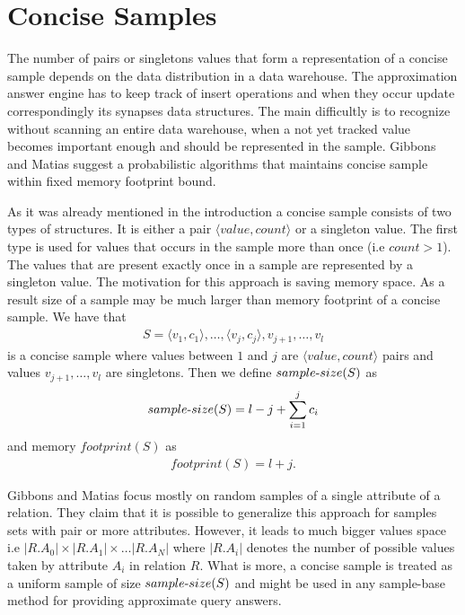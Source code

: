 \section{Concise Samples}
The number of pairs or singletons values that form a representation
of a concise sample depends on the data distribution in a data
warehouse. The approximation answer engine has to keep track of insert
operations and when they occur update correspondingly its synapses data structures.
The main difficultly is to recognize without scanning
an entire data warehouse, when a not yet tracked value becomes
important enough and should be represented in the sample. Gibbons and
Matias \cite{GM98} suggest a probabilistic
algorithms that maintains concise sample within fixed memory
footprint bound.

As it was already mentioned in the introduction a concise sample
consists of two types of structures. It is
either a pair $\langle value, count \rangle $ or a singleton value. The first
type is used for values that occurs in the sample more than once
(i.e $count > 1$). The values that are present exactly once in a sample
are represented by a singleton value. The motivation for this
approach is saving memory space. As a result size of a sample may be
much larger than memory footprint of a concise sample. We have that
\begin{align*}
  S = {\langle v_1, c_1 \rangle, \dots, \langle v_j, c_j \rangle,
    v_{j+1}, \dots, v_l }
\end{align*}
is a concise sample where values between $1$ and $j$ are $\langle
value, count \rangle$ pairs and values $v_{j+1}, \dots, v_l$ are
singletons. Then we define $sample \text{-} size(S)$ as
\begin{align*}
sample \text{-} size(S) = l - j + \sum_{i=1}^j c_i
\end{align*}
and memory $footprint(S)$ as
\begin{align*}
footprint(S) = l + j.
\end{align*}

Gibbons and Matias \cite{GM98} focus mostly on random
samples of a single attribute of a relation.
They claim that it is possible to generalize this
approach for samples sets with pair or more attributes. However, it
leads to much bigger values space i.e $ |R.A_0| \times |R.A_1| \times
\dots |R.A_N|$ where $|R.A_i|$ denotes the number of possible values taken by
attribute $A_i$ in relation $R$. What is more, a concise sample is
treated as a uniform sample of size $sample \text{-} size(S)$ and might
be used in any sample-base method for providing approximate query answers.

